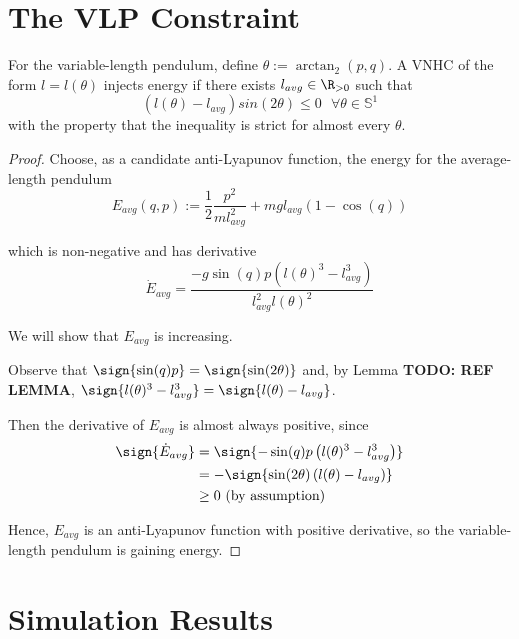 \section{The VLP Constraint}

\begin{thm}
For the variable-length pendulum, define \(\theta := \arctan_2(p,q)\). 
A VNHC of the form \(l = l(\theta)\) injects energy if there exists \(l_{avg} \in \R_{>0}\) such that
\[
   \left(l(\theta) - l_{avg}\right)sin(2\theta) \leq 0 \text{ }\forall \theta \in \mathbb{S}^1
\]
with the property that the inequality is strict for almost every \(\theta\).
\end{thm}
\begin{proof}
    Choose, as a candidate anti-Lyapunov function, the energy for the average-length pendulum 
    \[
       E_{avg}(q,p) := \frac{1}{2}\frac{p^2}{m l_{avg}^2} 
                    + m g l_{avg} (1-\cos(q))
    \]

    which is non-negative and has derivative 
    \[
      \dot{E}_{avg} = \frac{-g\sin(q)p \left(l(\theta)^3 - l_{avg}^3\right)}
                 {l_{avg}^2l(\theta)^2}
    \]

    We will show that \(E_{avg}\) is increasing.

    Observe that \(\sign{\sin(q)p} = \sign{\sin(2\theta)}\) and, 
    by Lemma \textbf{TODO: REF LEMMA},
    \( \sign{l(\theta)^3 - l_{avg}^3} 
     = \sign{ l(\theta) - l_{avg}}\). 

     Then the derivative of \(E_{avg}\) is almost always positive, since
     \begin{align*}
        \label{eq:}
        \sign{\dot{E}_{avg}} &= \sign{-\sin(q)p \left(l(\theta)^3 - l_{avg}^3\right)} \\
                    &= -\sign{\sin(2\theta) \left(l(\theta) - l_{avg}\right)} \\
                    &\geq 0 \text{ (by assumption)}
     \end{align*}

      Hence, \(E_{avg}\) is an anti-Lyapunov function with positive derivative,  
      so the variable-length pendulum is gaining energy.
\end{proof}

\section{Simulation Results}

